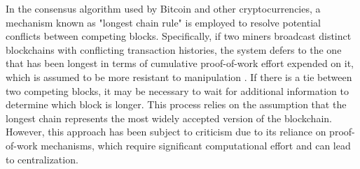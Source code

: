 In the consensus algorithm used by Bitcoin and other cryptocurrencies, a mechanism known as "longest chain rule" is employed to resolve
potential conflicts between competing blocks. Specifically, if two miners broadcast distinct blockchains with conflicting transaction
histories, the system defers to the one that has been longest in terms of cumulative proof-of-work effort expended on it, which is
assumed to be more resistant to manipulation \cite{buterin2014next}. If there is a tie between two competing blocks, it may be necessary
to wait for additional information to determine which block is longer. This process relies on the assumption that the longest chain
represents the most widely accepted version of the blockchain. However, this approach has been subject to criticism due to its reliance
on proof-of-work mechanisms, which require significant computational effort and can lead to centralization.
